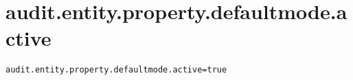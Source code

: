 \section{audit.entity.property.defaultmode.active}
\label{configuration:AuditEntityPropertyDefaultmodeActive}
\ClearAPI
\TODO
{}
\begin{lstlisting}[style=Props,caption={Usage example for \textit{audit.entity.property.defaultmode.active}}]
audit.entity.property.defaultmode.active=true
\end{lstlisting}